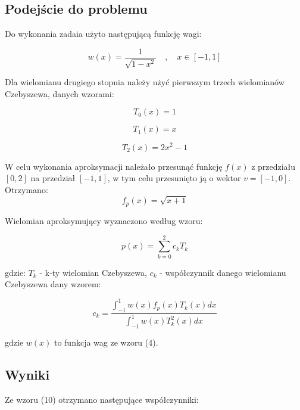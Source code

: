 \documentclass{article}
\begin{document}
	\subsection*{Podejście do problemu}	
	
	Do wykonania zadaia użyto następującą funkcję wagi:
	
	\begin{equation}
		w(x) = \frac{1}{\sqrt{1-x^2}} \quad , \quad x \in [-1, 1]
	\end{equation}
	
	Dla wielomianu drugiego stopnia należy użyć pierwszym trzech wielomianów Czebyszewa, danych wzorami:
	
	\begin{equation}
		T_0(x) = 1
	\end{equation}
	
	\begin{equation}
		T_1(x) = x
	\end{equation}
	
	\begin{equation}
		T_2(x) = 2x^2-1
	\end{equation}
	
	W celu wykonania aproksymacji należało przesunąć funkcję $f(x)$ z przedziału $[0,2]$ na przedział $[-1,1]$, w tym celu przesunięto ją o wektor $v = [-1,0]$. Otrzymano:
	\begin{equation}
		f_p(x) = \sqrt{x+1}
	\end{equation}
	
	Wielomian aproksymujący wyznaczono według wzoru:
	
	\begin{equation}
		p(x) = \sum^2_{k=0} c_k T_k
	\end{equation}
	
	gdzie: $T_k$ - k-ty wielomian Czebyszewa, $c_k$ - współczynnik danego wielomianu Czebyszewa dany wzorem:
	
	\begin{equation}
		c_k = \frac{\int^1_{-1} w(x)f_p(x)T_k(x) dx}{\int^1_{-1} w(x)T_k^2(x) dx}
	\end{equation}
	
	gdzie $w(x)$ to funkcja wag ze wzoru (4). 
	
	\subsection*{Wyniki}
	
	Ze wzoru (10) otrzymano następujące współczynniki:
	
\end{document}
